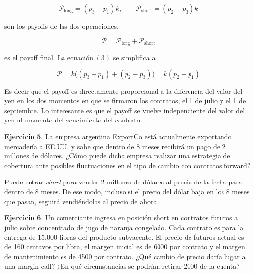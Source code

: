 \documentclass[a4paper, 12pt]{article}
\theoremstyle{definition}
\begin{document}
\begin{equation*}
    \mathcal{P}_{\text{long}} = (p_3 - p_1)k, \qquad \mathcal{P}_{\text{short}}
    = (p_2 - p_3)k
\end{equation*}

son los payoffs de las dos operaciones,

\begin{equation}
    \mathcal{P} = \mathcal{P}_{\text{long}} + \mathcal{P}_{\text{short}}
\end{equation}

es el payoff final. La ecuación $(3)$ se simplifica a 

\begin{equation}
    \mathcal{P} = k \big( (p_3 - p_1) + (p_2 - p_3) \big) = k(p_2 - p_1)
\end{equation}

Es decir que el payoff es directamente proporcional a la diferencia del valor
del yen en los dos momentos en que se firmaron los contratos, el 1 de julio y el
1 de septiembre. Lo interesante es que el payoff se vuelve independiente del
valor del yen al momento del vencimiento del contrato.

\pagebreak 

\begin{shaded}
   \textbf{Ejercicio 5}. La empresa argentina ExportCo está actualmente
   exportando mercadería a EE.UU. y sabe que dentro de 8 meses recibirá un pago
   de 2 millones de dólares. ¿Cómo puede dicha empresa realizar una estrategia
   de cobertura ante posibles fluctuaciones en el tipo de cambio con contratos
   forward?
\end{shaded}

Puede entrar \textit{short} para vender 2 millones de dólares al precio de la
fecha para dentro de 8 meses. De ese modo, incluso si el precio del dólar baja
en los 8 meses que pasan, seguirá vendiéndolos al precio de ahora.

\pagebreak 

\begin{shaded}
\textbf{Ejercicio 6}. Un comerciante ingresa en posición short en contratos
futuros a julio sobre concentrado de jugo de naranja congelado. Cada contrato es
para la entrega de 15.000 libras del producto subyacente. El precio de futuros
actual es de 160 centavos por libra, el margen inicial es de 6000 por contrato
y el margen de mantenimiento es de 4500 por contrato. ¿Qué cambio de precio
daría lugar a una margin call? ¿En qué circunstancias se podrían retirar 2000
de la cuenta?
\end{shaded}
\end{document}

